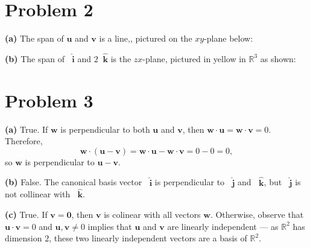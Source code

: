 \documentclass[11pt]{article}
\renewcommand{\vec}[1]{\mathbf{#1}}
\newcommand{\uvec}[1]{\mathop{} \!\hat{\mathbf{#1}}}
\begin{document}

\section{Problem 2}

\textbf{(a)} The span of $\vec{u}$ and $\vec{v}$ is a line,, pictured on the $xy$-plane below:


\textbf{(b)} The span of $\uvec{i}$ and $2\uvec{k}$ is the $zx$-plane, pictured in yellow in $\mathbb{R}^{3}$ as shown:



\section{Problem 3}

\textbf{(a)} True. If $\vec{w}$ is perpendicular to both $\vec{u}$ and $\vec{v}$, then $\vec{w} \cdot \vec{u} = \vec{w} \cdot \vec{v} = 0$. Therefore, 
\[
	\vec{w} \cdot (\vec{u} - \vec{v}) = \vec{w} \cdot \vec{u} - \vec{w} \cdot \vec{v} = 0 - 0 = 0,
\]
so $\vec{w}$ is perpendicular to $\vec{u} - \vec{v}$.

\textbf{(b)} False. The canonical basis vector $\uvec{i}$ is perpendicular to $\uvec{j}$ and $\uvec{k}$, but $\uvec{j}$ is not collinear with $\uvec{k}$.

\textbf{(c)} True. If $\vec{v} = \vec{0}$, then $\vec{v}$ is colinear with all vectors $\vec{w}$. Otherwise, observe that $\vec{u} \cdot \vec{v} = 0$ and $\vec{u}, \vec{v} \ne 0$ implies that $\vec{u}$ and $\vec{v}$ are linearly independent --- as $\mathbb{R}^{2}$ has dimension $2$, these two linearly independent vectors are a basis of $\mathbb{R}^{2}$.
\end{document}
